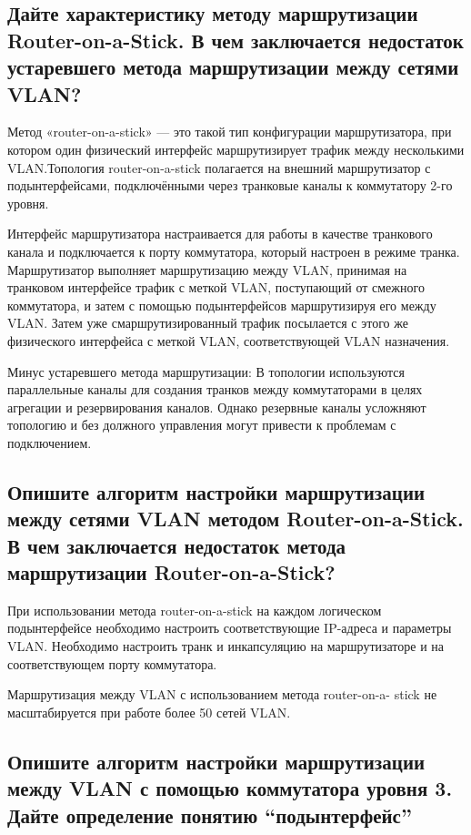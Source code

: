 \subsection{Дайте характеристику методу маршрутизации Router-on-a-Stick. В чем заключается недостаток
устаревшего метода маршрутизации между сетями VLAN?}

Метод «router-on-a-stick» — это такой тип конфигурации
маршрутизатора, при котором один физический интерфейс маршрутизирует
трафик между несколькими VLAN.Топология router-on-a-stick полагается на
внешний маршрутизатор с подынтерфейсами, подключёнными через
транковые каналы к коммутатору 2-го уровня.

Интерфейс маршрутизатора настраивается для работы в качестве
транкового канала и подключается к порту коммутатора, который настроен в
режиме транка. Маршрутизатор выполняет маршрутизацию между VLAN,
принимая на транковом интерфейсе трафик с меткой VLAN, поступающий от
смежного коммутатора, и затем с помощью подынтерфейсов маршрутизируя
его между VLAN. Затем уже смаршрутизированный трафик посылается с
этого же физического интерфейса с меткой VLAN, соответствующей VLAN
назначения.

Минус устаревшего метода маршрутизации: В топологии
используются параллельные каналы для создания транков между
коммутаторами в целях агрегации и резервирования каналов. Однако
резервные каналы усложняют топологию и без должного управления могут
привести к проблемам с подключением.

\subsection{Опишите алгоритм настройки маршрутизации между сетями VLAN методом Router-on-a-Stick. В чем
заключается недостаток метода маршрутизации Router-on-a-Stick?}

При использовании метода router-on-a-stick на каждом логическом
подынтерфейсе необходимо настроить соответствующие IP-адреса и
параметры VLAN. Необходимо настроить транк и инкапсуляцию на
маршрутизаторе и на соответствующем порту коммутатора.

Маршрутизация между VLAN с использованием метода router-on-a-
stick не масштабируется при работе более 50 сетей VLAN.

\subsection{Опишите алгоритм настройки маршрутизации между VLAN с помощью коммутатора уровня 3. Дайте
определение понятию “подынтерфейс” }

